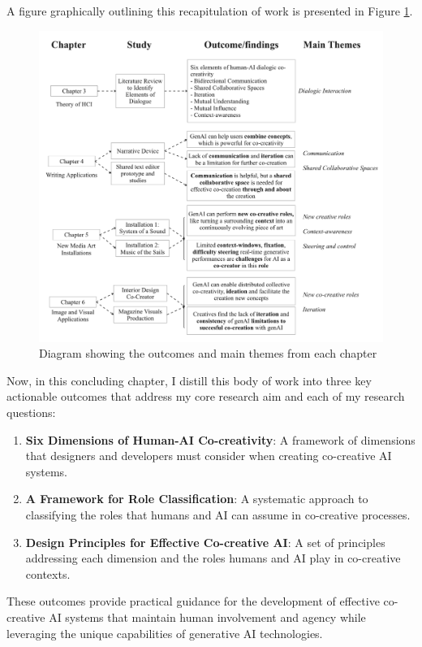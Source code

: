 A figure graphically outlining this recapitulation of work is presented in Figure \ref{fig:recap}.

\begin{figure}
    \centering
    \includegraphics[width=1\linewidth]{chapteroutcomes.png}
    \caption{Diagram showing the outcomes and main themes from each chapter}
    \label{fig:recap}
\end{figure}

Now, in this concluding chapter, I distill this body of work into three key actionable outcomes that address my core research aim and each of my research questions:

\begin{enumerate}
    \item \textbf{Six Dimensions of Human-AI Co-creativity}: A framework of dimensions that designers and developers must consider when creating co-creative AI systems.
    \item \textbf{A Framework for Role Classification}: A systematic approach to classifying the roles that humans and AI can assume in co-creative processes.
    \item \textbf{Design Principles for Effective Co-creative AI}: A set of principles addressing each dimension and the roles humans and AI play in co-creative contexts.
\end{enumerate}

These outcomes provide practical guidance for the development of effective co-creative AI systems that maintain human involvement and agency while leveraging the unique capabilities of generative AI technologies.

